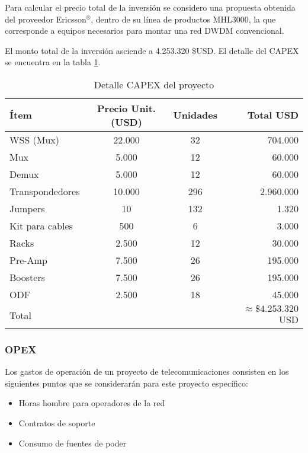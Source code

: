 Para calcular el precio total de la inversión se considero una propuesta obtenida del proveedor \newline Ericsson$^\circledR$, dentro de su línea de productos MHL3000, la que corresponde a equipos necesarios para montar una red DWDM convencional.

El monto total de la inversión asciende a 4.253.320 \$USD. El detalle del CAPEX se encuentra en la tabla \ref{tab:capex}.

\begin{table}[H]
  \centering
  \begin{tabular}{| l | c | c | r |}
    \hline
    \textbf{Ítem} & \textbf{Precio Unit. (USD)} & \textbf{Unidades} & \textbf{Total USD} \\
    \hline
    WSS (Mux) & 22.000 & 32 & 704.000\\
    \hline
    Mux  & 5.000 & 12 & 60.000 \\
    \hline
    Demux & 5.000 & 12 & 60.000 \\
    \hline
    Transpondedores  & 10.000 & 296 & 2.960.000 \\
    \hline
    Jumpers  & 10 & 132 & 1.320 \\
    \hline
    Kit para cables & 500 & 6 & 3.000 \\
    \hline
    Racks  & 2.500 & 12 & 30.000 \\
    \hline
    Pre-Amp & 7.500 & 26 & 195.000\\
    \hline
    Boosters & 7.500 & 26 & 195.000\\
    \hline
    ODF & 2.500 & 18 & 45.000\\
    \hline    
    Total & & & $\approx \$4.253.320$ USD \\
    \hline
  \end{tabular}
  \caption{Detalle CAPEX del proyecto}
  \label{tab:capex}
\end{table}

\subsubsection{OPEX}
\label{sec:opex}

Los gastos de operación de un proyecto de telecomunicaciones consisten en los siguientes puntos que se considerarán para este proyecto específico:
\begin{itemize}
\item Horas hombre para operadores de la red
\item Contratos de soporte
\item Consumo de fuentes de poder
\end{itemize}

